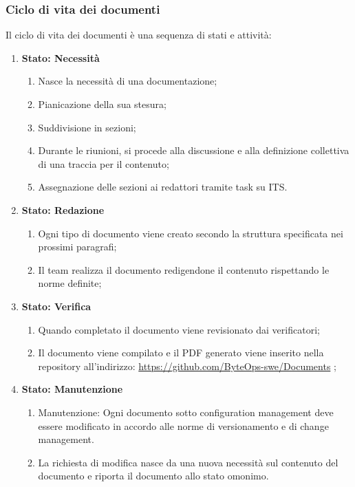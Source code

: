 \documentclass{article}
\begin{document}
\subsubsection{Ciclo di vita dei documenti}
Il ciclo di vita dei documenti è una sequenza di stati e attività:
\begin{enumerate}
    \item \textbf{Stato: Necessità}
          \begin{enumerate}
              \item Nasce la necessità di una documentazione;
              \item Pianicazione della sua stesura;
              \item Suddivisione in sezioni;
              \item Durante le riunioni, si procede alla discussione e alla definizione collettiva di una traccia per il contenuto;
              \item Assegnazione delle sezioni ai redattori tramite task su ITS.
          \end{enumerate}
    \item \textbf{Stato: Redazione}
          \begin{enumerate}
              \item  Ogni tipo di documento viene creato secondo la struttura specificata nei prossimi paragrafi;
              \item Il team realizza il documento redigendone il contenuto rispettando le norme definite;
          \end{enumerate}
    \item \textbf{Stato: Verifica}
          \begin{enumerate}
              \item Quando completato il documento viene revisionato dai verificatori;
              \item Il documento viene compilato e il PDF generato viene inserito nella repository all'indirizzo: \href{https://github.com/ByteOps-swe/Documents} {https://github.com/ByteOps-swe/Documents} ;
          \end{enumerate}
    \item \textbf{Stato: Manutenzione}
          \begin{enumerate}
              \item Manutenzione: Ogni documento sotto configuration management deve essere modificato in accordo alle norme di versionamento e di change management.
              \item La richiesta di modifica nasce da una nuova necessità sul contenuto del documento e riporta il documento allo stato omonimo.
          \end{enumerate}
\end{enumerate}
\end{document}
